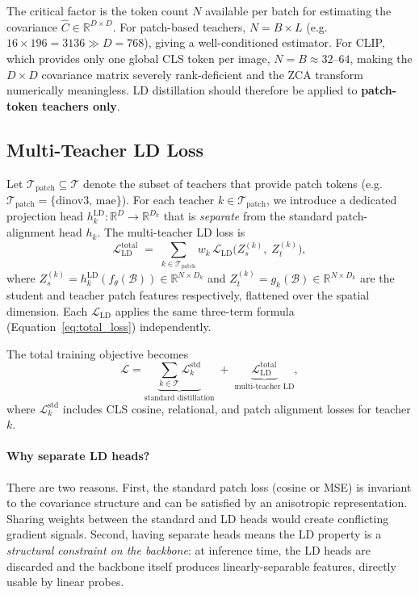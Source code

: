 \documentclass[11pt,a4paper]{article}
\newcommand{\R}{\mathbb{R}}
\newcommand{\calL}{\mathcal{L}}
\begin{document}
\noindent The critical factor is the token count $N$ available per batch for
estimating the covariance $\hat{C} \in \R^{D \times D}$.  For patch-based
teachers, $N = B \times L$ (e.g.\ $16 \times 196 = 3136 \gg D = 768$), giving a
well-conditioned estimator.  For CLIP, which provides only one global CLS token
per image, $N = B \approx 32\text{–}64$, making the $D \times D$ covariance
matrix severely rank-deficient and the ZCA transform numerically meaningless.
LD distillation should therefore be applied to \textbf{patch-token teachers only}.

\subsection{Multi-Teacher LD Loss}
\label{sec:multi_teacher_loss}

Let $\mathcal{T}_{\mathrm{patch}} \subseteq \mathcal{T}$ denote the subset of
teachers that provide patch tokens (e.g.\ $\mathcal{T}_{\mathrm{patch}} =
\{\mathrm{dinov3},\, \mathrm{mae}\}$).  For each teacher
$k \in \mathcal{T}_{\mathrm{patch}}$, we introduce a dedicated projection head
$h_k^{\mathrm{LD}} : \R^D \to \R^{D_k}$ that is \emph{separate} from the
standard patch-alignment head $h_k$.  The multi-teacher LD loss is
\begin{equation}
    \calL_{\mathrm{LD}}^{\mathrm{total}}
    \;=\; \sum_{k \in \mathcal{T}_{\mathrm{patch}}} w_k\,
    \calL_{\mathrm{LD}}\!\bigl(Z_s^{(k)},\; Z_t^{(k)}\bigr),
\label{eq:multi_ld}
\end{equation}
where $Z_s^{(k)} = h_k^{\mathrm{LD}}(f_\theta(\mathcal{B})) \in \R^{N \times D_k}$
and $Z_t^{(k)} = g_k(\mathcal{B}) \in \R^{N \times D_k}$ are the student and
teacher patch features respectively, flattened over the spatial dimension.
Each $\calL_{\mathrm{LD}}$ applies the same three-term formula
(Equation~\eqref{eq:total_loss}) independently.

The total training objective becomes
\begin{equation}
    \calL
    = \underbrace{\sum_{k \in \mathcal{T}} \calL_k^{\mathrm{std}}}_{\text{standard distillation}}
    \;+\;
    \underbrace{\calL_{\mathrm{LD}}^{\mathrm{total}}}_{\text{multi-teacher LD}},
\label{eq:grand_total}
\end{equation}
where $\calL_k^{\mathrm{std}}$ includes CLS cosine, relational, and patch
alignment losses for teacher $k$.

\paragraph{Why separate LD heads?}
There are two reasons.
First, the standard patch loss (cosine or MSE) is invariant to the covariance
structure and can be satisfied by an anisotropic representation.  Sharing weights
between the standard and LD heads would create conflicting gradient signals.
Second, having separate heads means the LD property is a \emph{structural
constraint on the backbone}: at inference time, the LD heads are discarded and
the backbone itself produces linearly-separable features, directly usable by
linear probes.
\end{document}
